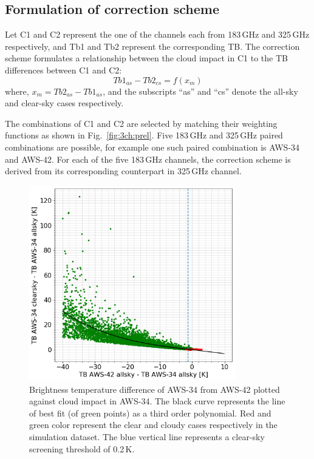 \documentclass[12pt]{article}
\begin{document}
\subsection{Formulation of correction scheme}
\label{sec:correction:scheme}
%
Let C1 and C2 represent the one of the channels each from 183\,GHz and 325\,GHz
respectively, and Tb1 and Tb2 represent the corresponding TB. The correction
scheme formulates a relationship between the cloud impact in C1 to the TB
differences between C1 and C2:
\begin{equation}
Tb1_{as}-Tb2_{cs} = f(x_m)
\label{eq:TB:diff}
\end{equation}
where, $x_m = Tb2_{as} - Tb1_{as}$, and the subscripts ``as'' and ``cs'' denote the all-sky and clear-sky cases respectively.  

The combinations of C1 and C2 are selected by matching their weighting
functions as shown in Fig.~\ref{fig:3ch:prel}. Five 183\,GHz and 325\,GHz paired
combinations are possible, for example one such paired combination is AWS-34
and AWS-42. For each of the five 183\,GHz channels, the correction scheme is
derived from its corresponding counterpart in 325\,GHz channel.

\begin{figure}[!tb]
	\centering
	\includegraphics[height=85mm]{fit_AWS-34_AWS-42}\hspace{5mm}%
	\caption{Brightness temperature difference of AWS-34 from AWS-42 plotted
      against cloud impact in AWS-34. The black curve represents the line of
      best fit (of green points) as a third order polynomial. Red and green
      color represent the clear and cloudy cases respectively in the simulation
      dataset. The blue vertical line represents a clear-sky screening
      threshold of 0.2\,K. }
	\label{fig:fit:c34-42}
\end{figure}
%
\end{document}

